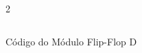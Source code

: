 \begin{figure}[H]
    \centering   
    \begin{tcolorbox}  
        \begin{multicols}{2} 
        \fontsize{9pt}{9pt}\selectfont\inputminted[obeytabs=true,tabsize=4,xleftmargin=20pt,linenos,breaklines]{VHDL}{VHDL/files/FFD.vhd}    
        \end{multicols}
    \end{tcolorbox}   
    \caption{Código do Módulo Flip-Flop D}
\end{figure}